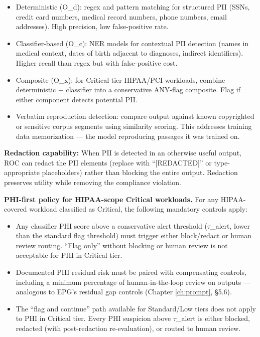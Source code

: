 \begin{itemize}
  \item Deterministic (O\_\allowbreak{}d): regex and pattern matching for structured PII (SSNs, credit card numbers, medical record numbers, phone numbers, email addresses). High precision, low false-positive rate.
  \item Classifier-based (O\_\allowbreak{}c): NER models for contextual PII detection (names in medical context, dates of birth adjacent to diagnoses, indirect identifiers). Higher recall than regex but with false-positive cost.
  \item Composite (O\_\allowbreak{}x): for Critical-tier HIPAA/PCI workloads, combine deterministic + classifier into a conservative ANY-flag composite. Flag if either component detects potential PII.
  \item Verbatim reproduction detection: compare output against known copyrighted or sensitive corpus segments using similarity scoring. This addresses training data memorization --- the model reproducing passages it was trained on.
\end{itemize}


\textbf{Redaction capability:} When PII is detected in an otherwise useful output, ROC can redact the PII elements (replace with ``[REDACTED]'' or type-appropriate placeholders) rather than blocking the entire output. Redaction preserves utility while removing the compliance violation.

\textbf{PHI-first policy for HIPAA-scope Critical workloads.} For any HIPAA-covered workload classified as Critical, the following mandatory controls apply:
\begin{itemize}
  \item Any classifier PHI score above a conservative alert threshold ($\tau$\_\allowbreak{}alert, lower than the standard flag threshold) must trigger either block/redact or human review routing. ``Flag only'' without blocking or human review is not acceptable for PHI in Critical tier.
  \item Documented PHI residual risk must be paired with compensating controls, including a minimum percentage of human-in-the-loop review on outputs --- analogous to EPG's residual gap controls (Chapter \ref{ch:prompt}, \S{}5.6).
  \item The ``flag and continue'' path available for Standard/Low tiers does not apply to PHI in Critical tier. Every PHI suspicion above $\tau$\_\allowbreak{}alert is either blocked, redacted (with post-redaction re-evaluation), or routed to human review.
\end{itemize}



